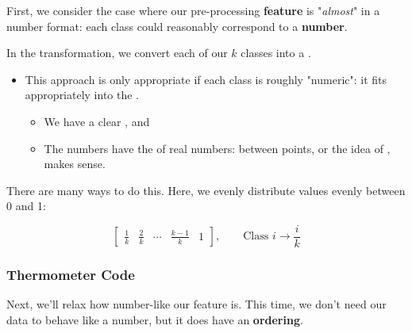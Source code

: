                 First, we consider the case where our pre-processing \textbf{feature} is "\textit{almost}" in a number format: each class could reasonably correspond to a \textbf{number}.\\
    
                \begin{definition}
                    In the  transformation, we convert each of our $k$ classes into a . 
    
                    \begin{itemize}
                        \item This approach is only appropriate if each class is roughly "numeric": it fits appropriately into the .
                            \begin{itemize}
                                \item We have a clear , and
                                \item The numbers have the  of real numbers:  between points, or the idea of , makes sense.
                            \end{itemize}
                    \end{itemize}
                \end{definition}

                \miniex There are many ways to do this. Here, we evenly distribute values evenly between 0 and 1:
    
                    \begin{equation}
                        \begin{bmatrix}
                            \frac{1}{k} & \frac{2}{k} & \cdots & \frac{k-1}{k} & 1
                        \end{bmatrix},
                        \qquad 
                        \text{Class } i \longrightarrow \frac{i}{k}
                    \end{equation}

            \subsecdiv
            \subsubsection{Thermometer Code}

                Next, we'll relax how number-like our feature is. This time, we don't need our data to behave like a number, but it does have an \textbf{ordering}.

